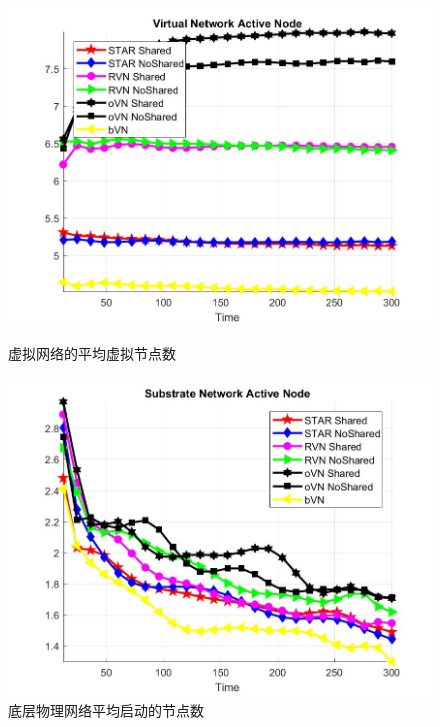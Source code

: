 \begin{figure}[htbp]
\centering
\begin{minipage}{0.4\textwidth}
\centering
\includegraphics[width=\textwidth]{figures/ActiveNodeAverageVirtualNetwork}
\caption{虚拟网络的平均虚拟节点数}\label{fig:ActiveNodeAverageVirtualNetwork}
\end{minipage}
\begin{minipage}{0.4\textwidth}
\centering
\includegraphics[width=\textwidth]{figures/ActiveNodeAverageSubstrateNetwork}
\caption{底层物理网络平均启动的节点数}\label{fig:ActiveNodeAverageSubstrateNetwork}
\end{minipage}
\end{figure}


